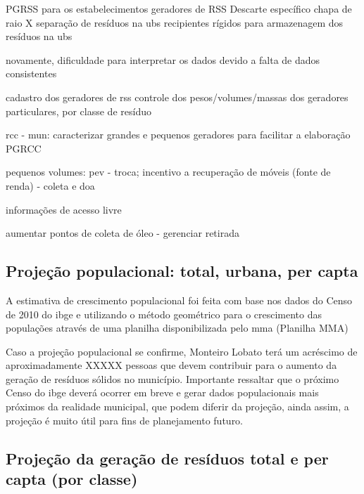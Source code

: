 

PGRSS para os estabelecimentos geradores de RSS
Descarte específico chapa de raio X
separação de resíduos na ubs 
recipientes rígidos para armazenagem dos resíduos na ubs

novamente, dificuldade para interpretar os dados devido a falta de dados consistentes

cadastro dos geradores de rss
controle dos pesos/volumes/massas dos geradores particulares, por classe de resíduo

rcc - mun: caracterizar grandes e pequenos geradores para facilitar a elaboração PGRCC

pequenos volumes: pev - troca; incentivo a recuperação de móveis (fonte de renda) - coleta e doa

informações de acesso livre

aumentar pontos de coleta de óleo - gerenciar retirada

\subsection{Projeção populacional: total, urbana, per capta}

A estimativa de crescimento populacional foi feita com base nos dados do Censo de 2010 do \gls{ibge} e utilizando o método geométrico para o crescimento das populações através de uma planilha disponibilizada pelo \gls{mma} (Planilha MMA)  %



Caso a projeção populacional se confirme, Monteiro Lobato terá um acréscimo de aproximadamente XXXXX pessoas que devem contribuir para o aumento da geração de resíduos sólidos no município. Importante ressaltar que o próximo Censo do \gls{ibge} deverá ocorrer em breve e gerar dados populacionais mais próximos da realidade municipal, que podem diferir da projeção, ainda assim, a projeção é muito útil para fins de planejamento futuro.

\subsection{Projeção da geração de resíduos total e per capta (por classe)}

